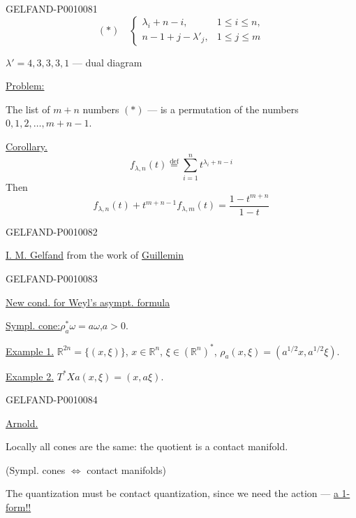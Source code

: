 \begin{GelfandAdjacentEvidence}{GELFAND-P001008}{1}
\[
(*)\quad\left\{
\begin{array}{ll}
\lambda_i+n-i,&1\leq i\leq n,\\
n-1+j-\lambda'_j,&1\leq j\leq m
\end{array}\right.
\]

$\lambda'=4,3,3,3,1$ --- dual diagram

\underline{Problem:}

The list of $m+n$ numbers $(*)$ --- is a permutation of the numbers $0,1,2,\ldots,m+n-1$.

\underline{Corollary.}
\[
f_{\lambda,n}(t)\overset{\mathrm{def}}{=}\sum_{i=1}^{n}t^{\lambda_i+n-i}
\]
Then
\[
f_{\lambda,n}(t)+t^{m+n-1}f_{\lambda,m}(t)=\frac{1-t^{m+n}}{1-t}
\]
\end{GelfandAdjacentEvidence}
\begin{GelfandAdjacentEvidence}{GELFAND-P001008}{2}


\underline{I. M. Gelfand} from the work of \underline{Guillemin}
\end{GelfandAdjacentEvidence}
\begin{GelfandAdjacentEvidence}{GELFAND-P001008}{3}


\underline{New cond. for Weyl’s asympt. formula}

\underline{Sympl. cone:}\qquad $\rho_a^*\omega=a\omega$,\quad $a>0$.

\underline{Example 1.} $\mathbb R^{2n}=\{(x,\xi)\}$,
$x\in\mathbb R^n$, $\xi\in(\mathbb R^n)^*$,
$\rho_a(x,\xi)=(a^{1/2}x,a^{1/2}\xi)$.

\underline{Example 2.} $T^*X$\qquad $a(x,\xi)=(x,a\xi)$.
\end{GelfandAdjacentEvidence}
\begin{GelfandAdjacentEvidence}{GELFAND-P001008}{4}


\underline{Arnold.}

Locally all cones are the same: the quotient is a contact manifold.

(Sympl. cones $\Longleftrightarrow$ contact manifolds)

The quantization must be contact quantization, since we need the action --- \underline{a 1-form!!}
\end{GelfandAdjacentEvidence}
